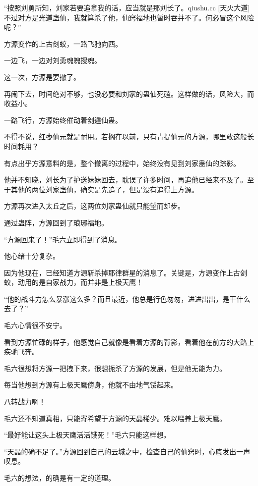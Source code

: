 
\begin{this_body}

“按照刘勇所知，刘家若要追拿我的话，应当就是那刘长了。qiushu.cc [天火大道]不过对方是光道蛊仙，我就算杀了他，仙窍福地也暂时吞并不了。何必冒这个风险呢？”

方源变作的上古剑蛟，一路飞驰向西。

一边飞，一边对刘勇魂魄搜魂。

这一次，方源是要撤了。

再闹下去，时间绝对不够，也没必要和刘家的蛊仙死磕。这样做的话，风险大，而收益小。

一路飞行，方源始终催动着剑遁仙蛊。

不得不说，红枣仙元就是耐用。若搁在以前，只有青提仙元的方源，哪里敢这般长时间耗用？

有点出乎方源意料的是，整个撤离的过程中，始终没有见到刘家蛊仙的踪影。

他并不知晓，刘长为了护送妹妹回去，耽误了许多时间，再追他已经来不及了。至于其他的两位刘家蛊仙，确实是先追了，但是没有追得上方源。

方源再次进入太丘之后，这两位刘家蛊仙就只能望而却步。

通过蛊阵，方源回到了琅琊福地。

“方源回来了！”毛六立即得到了消息。

他心绪十分复杂。

因为他现在，已经知道方源斩杀掉耶律群星的消息了。关键是，方源变作上古剑蛟，动用的是自家战力，而并非是上极天鹰！

“他的战斗力怎么暴涨这么多？而且最近，他总是行色匆匆，进进出出，是干什么去了？”

毛六心情很不安宁。

看到方源忙碌的样子，他感觉自己就像是看着方源的背影，看着他在前方的大路上疾驰飞奔。

毛六很想将方源一把拽下来，很想扼杀了方源的发展，但是他无能为力。

每当他想到方源有上极天鹰傍身，他就不由地气馁起来。

八转战力啊！

毛六还不知道真相，只能寄希望于方源的天晶稀少。难以喂养上极天鹰。

“最好能让这头上极天鹰活活饿死！”毛六只能这样想。

“天晶的确不足了。”方源回到自己的云城之中，检查自己的仙窍时，心底发出一声叹息。

毛六的想法，的确是有一定的道理。


\end{this_body}
